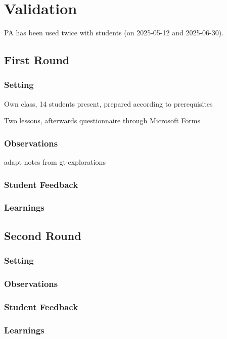 \chapter{Validation} \label{ch_practice}
PA has been used twice with students (on 2025-05-12 and 2025-06-30).



\section{First Round} \label{sc_validation_ca}


\subsection{Setting}

\begin{todo}
\item Own class, 14 students present, prepared according to prerequisites
\item Two lessons, afterwards questionnaire through Microsoft Forms
\end{todo}


\subsection{Observations}

\begin{todo}
\item adapt notes from gt-explorations
\end{todo}


\subsection{Student Feedback}


\subsection{Learnings}



\section{Second Round} \label{sc_validation_compiler}
\subsection{Setting}
\subsection{Observations}
\subsection{Student Feedback}
\subsection{Learnings}
